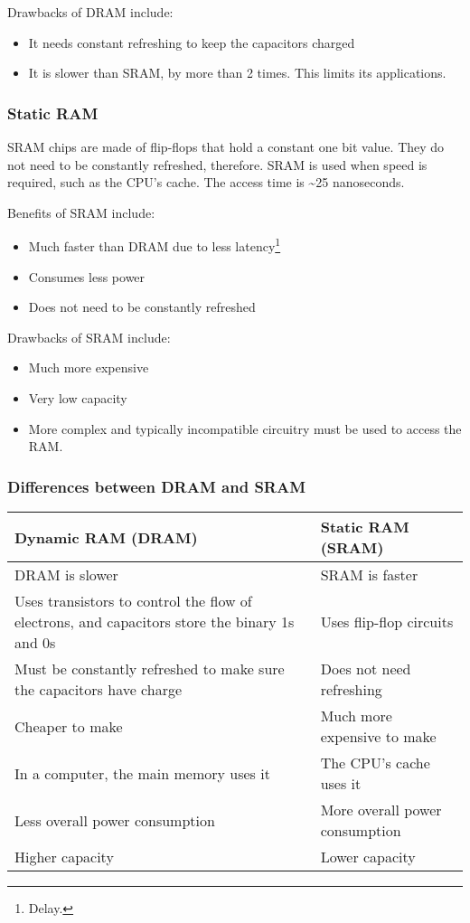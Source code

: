 \documentclass[../main.tex]{subfiles}
\begin{document}
Drawbacks of DRAM include:

\begin{itemize}
    \item It needs constant refreshing to keep the capacitors charged
    \item It is slower than SRAM, by more than 2 times. This limits its applications.
\end{itemize}

\subsubsection{Static RAM}

SRAM chips are made of flip-flops that hold a constant one bit value. They do not need to be constantly refreshed, therefore. SRAM is used when speed is required, such as the CPU's cache. The access time is \textasciitilde25 nanoseconds.

Benefits of SRAM include:

\begin{itemize}
    \item Much faster than DRAM due to less latency\footnote{Delay.}
    \item Consumes less power
    \item Does not need to be constantly refreshed
\end{itemize}

Drawbacks of SRAM include:

\begin{itemize}
    \item Much more expensive
    \item Very low capacity
    \item More complex and typically incompatible circuitry must be used to access the RAM.
\end{itemize}

\subsubsection{Differences between DRAM and SRAM}

\begin{longtable}{|p{}|p{}|}
    \hline 
    \textbf{Dynamic RAM (DRAM)} & \textbf{Static RAM (SRAM)}
    \\ \hline
    DRAM is slower & SRAM is faster
    \\ \hline
    Uses transistors to control the flow of electrons, and capacitors store the binary 1s and 0s & Uses flip-flop circuits
    \\ \hline
    Must be constantly refreshed to make sure the capacitors have charge & Does not need refreshing
    \\ \hline
    Cheaper to make & Much more expensive to make
    \\ \hline
    In a computer, the main memory uses it & The CPU's cache uses it
    \\ \hline
    Less overall power consumption & More overall power consumption
    \\ \hline
    Higher capacity & Lower capacity
    \\ \hline
\end{longtable}
\end{document}
